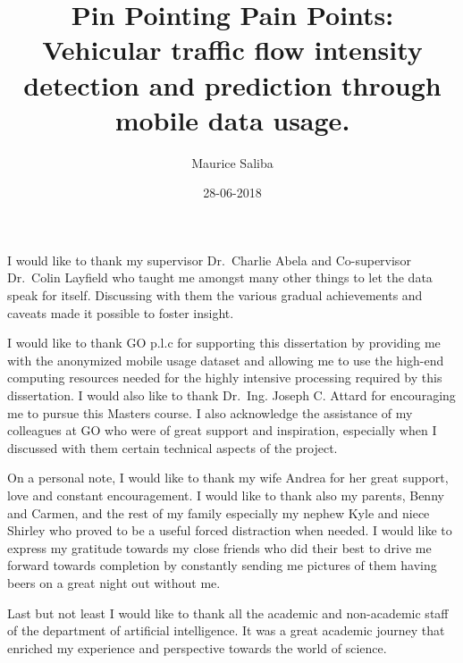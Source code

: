 \documentclass[12pt, a4paper]{report}
\theoremstyle{definition}
\theoremstyle{definition}%
\theoremstyle{definition}%
\theoremstyle{definition}%
\theoremstyle{definition}%
\theoremstyle{definition}%
\begin{document}
\title{Pin Pointing Pain Points: Vehicular traffic flow intensity detection and prediction through mobile data usage.}
\author{Maurice Saliba}
\date{28-06-2018}

\frontmatter


\begin{acknowledgements}

I would like to thank my supervisor Dr.~Charlie Abela and Co-supervisor Dr.~Colin Layfield who taught me amongst many other things to let the data speak for itself. Discussing with them the various gradual achievements and caveats made it possible to foster insight.

I would like to thank GO p.l.c for supporting this dissertation by providing me with the anonymized mobile usage dataset and allowing me to use the high-end computing resources needed for the highly intensive processing required by this dissertation. I would also like to thank Dr.~Ing. Joseph C. Attard for encouraging me to pursue this Masters course. I also acknowledge the assistance of my colleagues at GO who were of great support and inspiration, especially when I discussed with them certain technical aspects of the project.

On a personal note, I would like to thank my wife Andrea for her great support, love and constant encouragement. I would like to thank also my parents, Benny and Carmen, and the rest of my family especially my nephew Kyle and niece Shirley who proved to be a useful forced distraction when needed. I would like to express my gratitude towards my close friends who did their best to drive me forward towards completion by constantly sending me pictures of them having beers on a great night out without me. 

Last but not least I would like to thank all the academic and non-academic staff of the department of artificial intelligence. It was a great academic journey that enriched my experience and perspective towards the world of science.



\end{acknowledgements}
       
\end{document}
